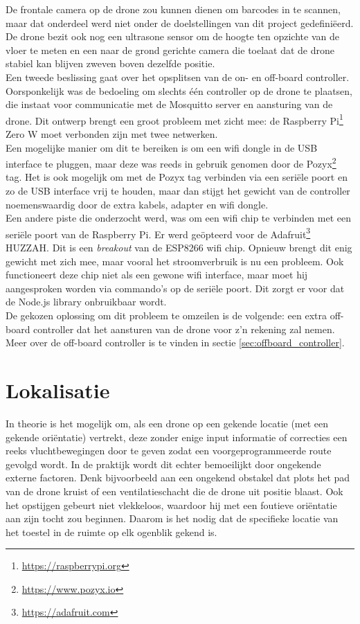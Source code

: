 De frontale camera op de drone zou kunnen dienen om barcodes in te scannen, maar dat onderdeel werd niet onder de doelstellingen van dit project gedefiniëerd.
De drone bezit ook nog een ultrasone sensor om de hoogte ten opzichte van de vloer te meten en een naar de grond gerichte camera die toelaat dat de drone stabiel kan blijven zweven boven dezelfde positie.\\

Een tweede beslissing gaat over het opsplitsen van de on- en off-board controller.
Oorsponkelijk was de bedoeling om slechts één controller op de drone te plaatsen, die instaat voor communicatie met de Mosquitto server en aansturing van de drone.
Dit ontwerp brengt een groot probleem met zicht mee: de Raspberry Pi\footnote{\url{https://raspberrypi.org}} Zero W moet verbonden zijn met twee netwerken.\\
Een mogelijke manier om dit te bereiken is om een wifi dongle in de USB interface te pluggen, maar deze was reeds in gebruik genomen door de Pozyx\footnote{\url{https://www.pozyx.io}} tag.
Het is ook mogelijk om met de Pozyx tag verbinden via een seriële poort en zo de USB interface vrij te houden, maar dan stijgt het gewicht van de controller noemenswaardig door de extra kabels, adapter en wifi dongle.\\
Een andere piste die onderzocht werd, was om een wifi chip te verbinden met een seriële poort van de Raspberry Pi.
Er werd geöpteerd voor de Adafruit\footnote{\url{https://adafruit.com}} HUZZAH.
Dit is een \textit{breakout} van de ESP8266 wifi chip.
Opnieuw brengt dit enig gewicht met zich mee, maar vooral het stroomverbruik is nu een probleem.
Ook functioneert deze chip niet als een gewone wifi interface, maar moet hij aangesproken worden via commando's op de seriële poort.
Dit zorgt er voor dat de Node.js library onbruikbaar wordt.\\
De gekozen oplossing om dit probleem te omzeilen is de volgende: een extra off-board controller dat het aansturen van de drone voor z'n rekening zal nemen.
Meer over de off-board controller is te vinden in sectie \ref{sec:offboard_controller}.

\section{Lokalisatie} \label{sec:localization}
In theorie is het mogelijk om, als een drone op een gekende locatie (met een gekende oriëntatie) vertrekt, deze zonder enige input informatie of correcties een reeks vluchtbewegingen door te geven zodat een voorgeprogrammeerde route gevolgd wordt.
In de praktijk wordt dit echter bemoeilijkt door ongekende externe factoren. Denk bijvoorbeeld aan een ongekend obstakel dat plots het pad van de drone kruist of een ventilatieschacht die de drone uit positie blaast.
Ook het opstijgen gebeurt niet vlekkeloos, waardoor hij met een foutieve oriëntatie aan zijn tocht zou beginnen.
Daarom is het nodig dat de specifieke locatie van het toestel in de ruimte op elk ogenblik gekend is.\\

